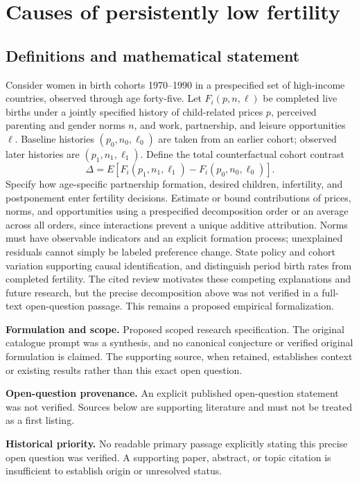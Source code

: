 \documentclass[11pt]{article}
\begin{document}
\section*{Causes of persistently low fertility}\label{30007737}
\subsection{Definitions and mathematical statement}
Consider women in birth cohorts 1970–1990 in a prespecified set of high-income countries, observed through age forty-five. Let \(F_i(p,n,\ell)\) be completed live births under a jointly specified history of child-related prices \(p\), perceived parenting and gender norms \(n\), and work, partnership, and leisure opportunities \(\ell\). Baseline histories \((p_0,n_0,\ell_0)\) are taken from an earlier cohort; observed later histories are \((p_1,n_1,\ell_1)\). Define the total counterfactual cohort contrast
\[\Delta=E[F_i(p_1,n_1,\ell_1)-F_i(p_0,n_0,\ell_0)].\]
Specify how age-specific partnership formation, desired children, infertility, and postponement enter fertility decisions. Estimate or bound contributions of prices, norms, and opportunities using a prespecified decomposition order or an average across all orders, since interactions prevent a unique additive attribution. Norms must have observable indicators and an explicit formation process; unexplained residuals cannot simply be labeled preference change. State policy and cohort variation supporting causal identification, and distinguish period birth rates from completed fertility. The cited review motivates these competing explanations and future research, but the precise decomposition above was not verified in a full-text open-question passage. This remains a proposed empirical formalization.

\par\textbf{Formulation and scope.} Proposed scoped research specification. The original catalogue prompt was a synthesis, and no canonical conjecture or verified original formulation is claimed. The supporting source, when retained, establishes context or existing results rather than this exact open question.

\par\textbf{Open-question provenance.} An explicit published open-question statement was not verified. Sources below are supporting literature and must not be treated as a first listing.

\par\textbf{Historical priority.} No readable primary passage explicitly stating this precise open question was verified. A supporting paper, abstract, or topic citation is insufficient to establish origin or unresolved status.
\end{document}

